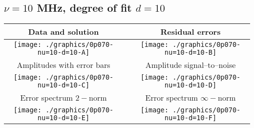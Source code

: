

% 

\clearpage{}
\break{}

\subsection{$\nu = 10$ MHz, degree of fit $d = 10$}

\begin{table}[h]
    \begin{center}
        \begin{tabular}{ccc}
            Data and solution & \quad & Residual errors \\\hline
            \texttt{[image: ./graphics/0p070-nu=10-d=10-A]} &&
            \texttt{[image: ./graphics/0p070-nu=10-d=10-B]} \\[15pt]
            Amplitudes with error bars && Amplitude signal--to--noise \\\hline
            \texttt{[image: ./graphics/0p070-nu=10-d=10-C]} &&
            \texttt{[image: ./graphics/0p070-nu=10-d=10-D]} \\[15pt]
            Error spectrum $2-$norm && Error spectrum $\infty-$norm \\\hline
            \texttt{[image: ./graphics/0p070-nu=10-d=10-E]} &&
            \texttt{[image: ./graphics/0p070-nu=10-d=10-F]} \\[15pt]
        \end{tabular}
    \end{center}
\label{fig:elev=70, nu=10}
\end{table}



\endinput
